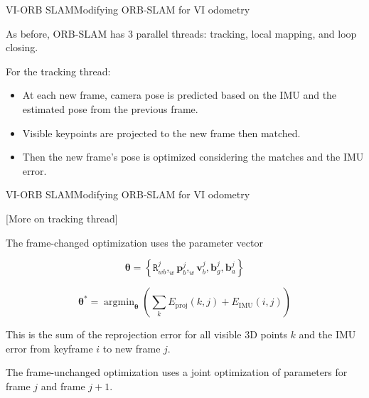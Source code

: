 \documentclass[aspectratio=169]{beamer}
\renewcommand{\vec}[1]{\boldsymbol{#1}}
\newcommand{\mat}[1]{\mathtt{#1}}
\DeclareMathOperator*{\argmin}{argmin}
\newcommand{\myfig}[3]{\centerline{\texttt{[image: \#2]}}
    \centerline{\scriptsize \begin{minipage}{#1} \centering #3 \end{minipage}}}
\begin{document}
\begin{frame}{VI-ORB SLAM}{Modifying ORB-SLAM for VI odometry}

As before, ORB-SLAM has 3 parallel threads: tracking, local mapping, and loop
closing.

\medskip

For the \alert{tracking thread}:
\begin{itemize}
\item At each new frame, camera pose is predicted based on
   the IMU and the estimated pose from the previous frame.
\item Visible keypoints
   are projected to the new frame then matched.
\item Then the new frame's pose
   is optimized considering the matches and the IMU error.
\end{itemize}

\end{frame}




\begin{frame}{VI-ORB SLAM}{Modifying ORB-SLAM for VI odometry}

[More on tracking thread]

\medskip

The frame-changed optimization uses the parameter vector

$$\vec{\theta} = \left\{ \mat{R}^j_{wb},_w\vec{p}_b^j,_w\vec{v}^j_b,
                         \vec{b}^j_g,\vec{b}_a^j \right\}$$

$$\vec{\theta}^* = \argmin_{\vec{\theta}} \left(\sum_k E_{\mathrm{proj}}(k,j)
                                              + E_{\mathrm{IMU}}(i,j)\right)$$

This is the sum of the reprojection error for all visible 3D points $k$
and the IMU error from keyframe $i$ to new frame $j$.

\medskip

The frame-unchanged optimization uses a joint optimization of parameters
for frame $j$ and frame $j+1$.

\end{frame}
\end{document}
